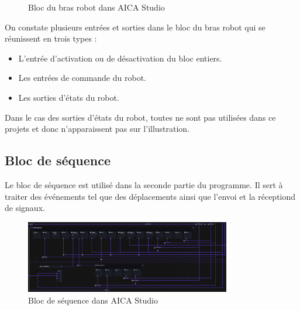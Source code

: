 \begin{figure}[H]
    \caption{Bloc du bras robot dans AICA Studio}
    \label{fig:robot_block}
\end{figure}

On constate plusieurs entrées et sorties dans le bloc du bras robot qui se réunissent en trois types :
\begin{itemize}
    \item L'entrée d'activation ou de désactivation du bloc entiers.
    \item Les entrées de commande du robot.
    \item Les sorties d'états du robot.
\end{itemize}


Dans le cas des sorties d'états du robot, toutes ne sont pas utilisées dans ce projets et donc n'apparaissent pas sur l'illustration.

\subsection{Bloc de séquence}

Le bloc de séquence est utilisé dans la seconde partie du programme. Il sert à traiter des événements tel que des déplacements ainsi que l'envoi et la réceptiond de signaux.

\begin{figure}[H]
    \centering
    \includegraphics[width=0.8\textwidth]{assets/figures/AICA_Sequence (2).png}
    \caption{Bloc de séquence dans AICA Studio}
    \label{fig:sequence_block}
\end{figure}

